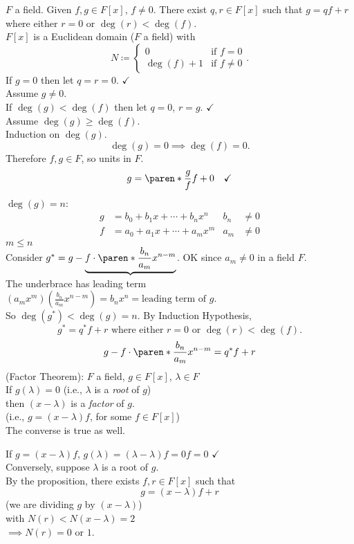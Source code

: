 \prop $F$ a field.  Given $f,g\in F[x]$, $f\neq0$.  There exist $q,r\in F[x]$ such that $g=qf+r$ where either $r=0$ or $\deg(r)<\deg(f)$. \\
\cor $F[x]$ is a Euclidean domain ($F$ a field) with
\[ N \coloneqq \begin{cases}
0 & \text{if $f=0$} \\
\deg(f)+1 & \text{if $f\neq0$}
\end{cases} . \]
\pf If $g=0$ then let $q=r=0$. $\checkmark$ \\
Assume $g\neq0$. \\
If $\deg(g)<\deg(f)$ then let $q=0$, $r=g$. $\checkmark$ \\
Assume $\deg(g)\geq\deg(f)$. \\
Induction on $\deg(g)$.
\[ \deg(g)=0 \implies \deg(f)=0. \]
Therefore $f,g\in F$, so units in $F$.
\[ g = \paren*{\frac{g}{f}} f + 0 \quad\checkmark \]
$\deg(g)=n$:
\begin{align*}
g &= b_0 + b_1x + \dotsb + b_nx^n & b_n &\neq 0 \\
f &= a_0 + a_1x + \dotsb + a_mx^m & a_m &\neq 0
\end{align*}
$m\leq n$ \\
Consider $g^* = g - \underbrace{f\cdot\paren*{\frac{b_n}{a_m}x^{n-m}}}$.  OK since $a_m\neq0$ in a field $F$. \\
The underbrace has leading term $(a_mx^m)(\frac{b_n}{a_m}x^{n-m})=b_nx^n=\text{leading term of $g$}$. \\
So $\deg(g^*)<\deg(g)=n$.  By Induction Hypothesis,
\[ g^* = q^* f + r \text{ where either $r=0$ or $\deg(r)<\deg(f)$} . \]
\[ g - f\cdot\paren*{\frac{b_n}{a_m}x^{n-m}} = q^* f + r \]
\cor (Factor Theorem): $F$ a field, $g\in F[x]$, $\lambda\in F$ \\
If $g(\lambda)=0$ (i.e., $\lambda$ is a \emph{root} of $g$) \\
then $(x-\lambda)$ is a \emph{factor} of $g$. \\
(i.e., $g=(x-\lambda)f$, for some $f\in F[x]$) \\
The converse is true as well.

\pf If $g=(x-\lambda)f$,
$g(\lambda)=(\lambda-\lambda)f=0f=0$ $\checkmark$ \\
Conversely, suppose $\lambda$ is a root of $g$. \\
By the proposition, there exists $f,r\in F[x]$ such that
\[ g = (x-\lambda)f + r \]
(we are dividing $g$ by $(x-\lambda)$) \\
with $N(r)<N(x-\lambda)=2$ \\
$\implies N(r)=0$ or $1$.

